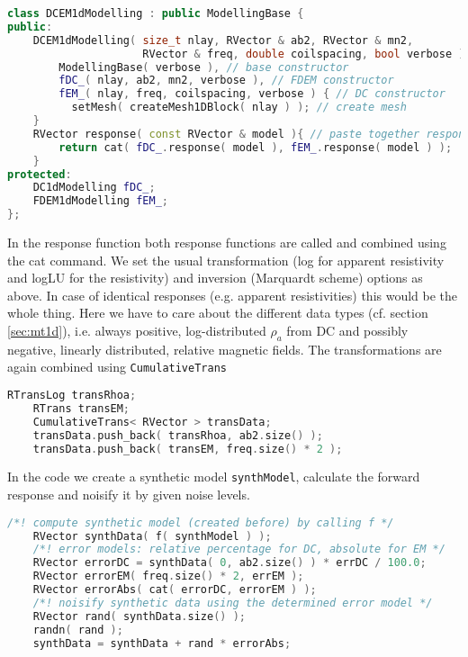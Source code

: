 \begin{lstlisting}[language=C++,morekeywords={RVector,RMatrix}]
class DCEM1dModelling : public ModellingBase {
public:
    DCEM1dModelling( size_t nlay, RVector & ab2, RVector & mn2, 
                     RVector & freq, double coilspacing, bool verbose ) : 
    	ModellingBase( verbose ), // base constructor
    	fDC_( nlay, ab2, mn2, verbose ), // FDEM constructor
    	fEM_( nlay, freq, coilspacing, verbose ) { // DC constructor 
          setMesh( createMesh1DBlock( nlay ) ); // create mesh
    }
    RVector response( const RVector & model ){ // paste together responses
        return cat( fDC_.response( model ), fEM_.response( model ) ); 
    }
protected:
    DC1dModelling fDC_;
    FDEM1dModelling fEM_;
};
\end{lstlisting}

In the response function both response functions are called and combined using the cat command.
We set the usual transformation (log for apparent resistivity and logLU for the resistivity) and inversion (Marquardt scheme) options as above.
In case of identical responses (e.g. apparent resistivities) this would be the whole thing.
Here we have to care about the different data types (cf. section \ref{sec:mt1d}), i.e. always positive, log-distributed $\rho_a$ from DC and possibly negative, linearly distributed, relative magnetic fields.
The transformations are again combined using \lstinline|CumulativeTrans|
\begin{lstlisting}[language=C++,morekeywords={RVector,RMatrix}]
    RTransLog transRhoa;
    RTrans transEM;
    CumulativeTrans< RVector > transData;
    transData.push_back( transRhoa, ab2.size() );
    transData.push_back( transEM, freq.size() * 2 );
\end{lstlisting}

In the code we create a synthetic model \lstinline|synthModel|, calculate the forward response and noisify it by given noise levels.

\begin{lstlisting}[language=C++,morekeywords={RVector,RMatrix}]
    /*! compute synthetic model (created before) by calling f */
    RVector synthData( f( synthModel ) );   
    /*! error models: relative percentage for DC, absolute for EM */
    RVector errorDC = synthData( 0, ab2.size() ) * errDC / 100.0;
    RVector errorEM( freq.size() * 2, errEM );
    RVector errorAbs( cat( errorDC, errorEM ) );    
    /*! noisify synthetic data using the determined error model */
    RVector rand( synthData.size() );
    randn( rand );
    synthData = synthData + rand * errorAbs;
\end{lstlisting}


